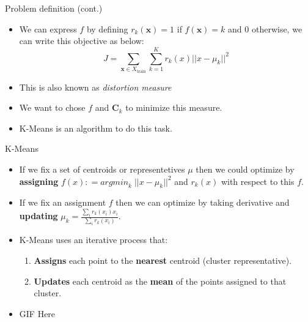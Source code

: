 \documentclass[serif, aspectratio=169]{beamer}
\begin{document}
\begin{frame}{Problem definition (cont.)}
    \begin{itemize}
        

        \item  We can express $f$ by defining $r_k(\mathbf{x}) = 1$ if $f(\mathbf{x}) = k$ and $0$ otherwise, we can write this objective as below:
$$
J = \sum_{\mathbf{x} \in X_{\text{train}}} \sum_{k=1}^{K} r_k(x)|| x -  \mu_k ||^2
$$
        \item This is also known as \textit{distortion measure}
        \item We want to chose $f$ and $\mathbf{C}_k$ to minimize this measure.
        \item K-Means is an algorithm to do this task.

        
    \end{itemize}
\end{frame}


\begin{frame}{K-Means }
    \begin{itemize}
   

\item If we fix a set of centroids or representetives $\mu$ then we could optimize by \textbf{assigning} $f(x) : = \textit{argmin}_k \; ||x - \mu_k||^2$ and $r_k(x)$ with respect to this $f$.
\item If we fix an assignment $f$ then we can optimize by taking derivative and \textbf{updating} $\mu_k = \frac{\sum_i r_k(x_i) x_i}{\sum_i r_k(x_i) }$.
\item K-Means uses an iterative process that:
\begin{enumerate}
    \item \textbf{Assigns} each point to the \textbf{nearest} centroid (cluster representative).
    \item \textbf{Updates} each centroid as the \textbf{mean} of the points assigned to that cluster.

\end{enumerate}
    \item GIF Here
    \end{itemize}
\end{frame}
\end{document}
